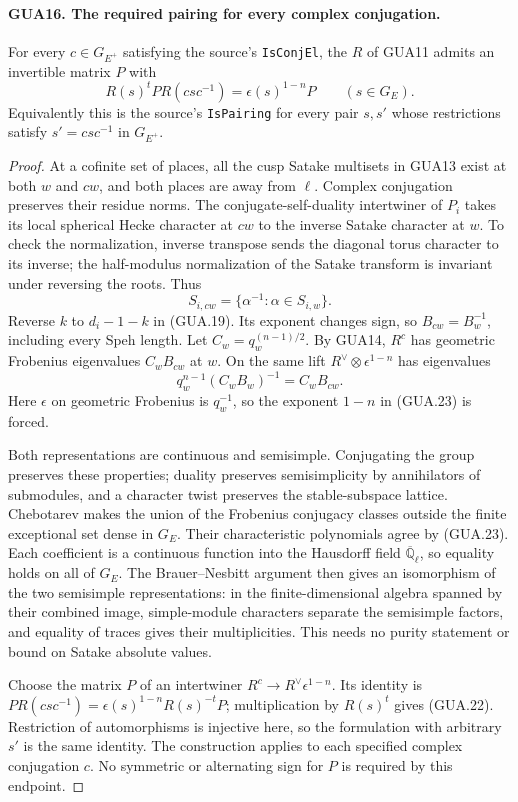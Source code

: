 \paragraph{GUA16. The required pairing for every complex conjugation.}
\label{claim:GUA16}
For every $c\in G_{E^+}$ satisfying the source's
\texttt{IsConjEl}, the $R$ of GUA11 admits an
invertible matrix $P$ with
\[
       R(s)^t P R(csc^{-1})=\epsilon(s)^{1-n}P
                                      \qquad(s\in G_E). 
                                                        \tag{GUA.22}
\]
Equivalently this is the source's \texttt{IsPairing}
for every pair $s,s'$ whose restrictions satisfy
$s'=csc^{-1}$ in $G_{E^+}$.
\begin{proof}
At a cofinite set of places, all the cusp Satake
multisets in GUA13 exist at both $w$ and $cw$, and
both places are away from $\ell$.  Complex
conjugation preserves their residue norms.  The
conjugate-self-duality intertwiner of $P_i$ takes
its local spherical Hecke character at $cw$ to the
inverse Satake character at $w$.  To check the
normalization, inverse transpose sends the diagonal
torus character to its inverse; the half-modulus
normalization of the Satake transform is invariant
under reversing the roots.  Thus
\[
                 S_{i,cw}=\{\alpha^{-1}:\alpha\in S_{i,w}\}.
\]
Reverse $k$ to $d_i-1-k$ in (GUA.19).  Its exponent
changes sign, so $B_{cw}=B_w^{-1}$, including every
Speh length.  Let $C_w=q_w^{(n-1)/2}$.
By GUA14, $R^c$ has geometric Frobenius eigenvalues
$C_wB_{cw}$ at $w$.  On the same lift
$R^\vee\otimes\epsilon^{1-n}$ has eigenvalues
\[
         q_w^{n-1}(C_wB_w)^{-1}
                  =C_wB_{cw}.                         \tag{GUA.23}
\]
Here $\epsilon$ on geometric Frobenius is $q_w^{-1}$,
so the exponent $1-n$ in (GUA.23) is forced.

Both representations are continuous and semisimple.
Conjugating the group preserves these properties;
duality preserves semisimplicity by annihilators
of submodules, and a character twist preserves
the stable-subspace lattice.  Chebotarev makes
the union of the Frobenius conjugacy classes
outside the finite exceptional set dense in $G_E$.
Their characteristic polynomials agree by (GUA.23).
Each coefficient is a continuous function into
the Hausdorff field $\overline{\mathbb Q}_\ell$,
so equality holds on all of $G_E$.  The
Brauer--Nesbitt argument then gives an isomorphism
of the two semisimple representations: in the
finite-dimensional algebra spanned by their
combined image, simple-module characters separate
the semisimple factors, and equality of traces
gives their multiplicities.  This needs no purity
statement or bound on Satake absolute values.

Choose the matrix $P$ of an intertwiner
$R^c\longrightarrow R^\vee\epsilon^{1-n}$.
Its identity is
$P R(csc^{-1})=\epsilon(s)^{1-n}R(s)^{-t}P$;
multiplication by $R(s)^t$ gives (GUA.22).
Restriction of automorphisms is injective here,
so the formulation with arbitrary $s'$ is the
same identity.  The construction applies to each
specified complex conjugation $c$.  No symmetric
or alternating sign for $P$ is required by this endpoint.
\end{proof}

